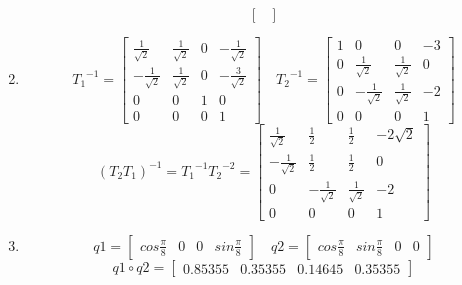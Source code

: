 \documentclass[11pt]{article}
\begin{document}
\begin{solution}
\begin{enumerate}[1.]
\[\begin{bmatrix}
            \end{bmatrix}
        \]
    \item
    \[
        {T_1}^{-1} =
        \begin{bmatrix}
            \frac{1}{\sqrt{2}} & \frac{1}{\sqrt{2}} & 0 & -\frac{1}{\sqrt{2}} \\
            -\frac{1}{\sqrt{2}} & \frac{1}{\sqrt{2}} & 0 & -\frac{3}{\sqrt{2}} \\
            0 & 0 & 1 & 0\\
            0 & 0 & 0 & 1
        \end{bmatrix}
        \quad
        {T_2}^{-1} =
        \begin{bmatrix}
            1 & 0 & 0 & -3\\
            0 & \frac{1}{\sqrt{2}} & \frac{1}{\sqrt{2}} & 0 \\
            0 & -\frac{1}{\sqrt{2}} & \frac{1}{\sqrt{2}} & -2 \\
            0 & 0 & 0 & 1
        \end{bmatrix}
    \]
    \[
        {(T_2T_1)}^{-1} = {T_1}^{-1} {T_2}^{-2} =
        \begin{bmatrix}
            \frac{1}{\sqrt{2}} & \frac{1}{2} & \frac{1}{2} & -2\sqrt{2}\\
            -\frac{1}{\sqrt{2}} & \frac{1}{2} & \frac{1}{2} & 0\\
            0 & -\frac{1}{\sqrt{2}} & \frac{1}{\sqrt{2}} & -2 \\
            0 & 0 & 0 & 1
        \end{bmatrix}
    \]
    \item
    \[
        q1 = 
        \begin{bmatrix}
            cos\frac{\pi}{8} & 0 & 0 & sin\frac{\pi}{8}
        \end{bmatrix}
        \quad
        q2 =
        \begin{bmatrix}
            cos\frac{\pi}{8} & sin\frac{\pi}{8} & 0 & 0
        \end{bmatrix} 
    \]
    \[
        q1 \circ q2 = 
        \begin{bmatrix}
            0.85355 & 0.35355 & 0.14645 & 0.35355
        \end{bmatrix}
    \]
\end{enumerate}

\end{solution}
\end{document}

